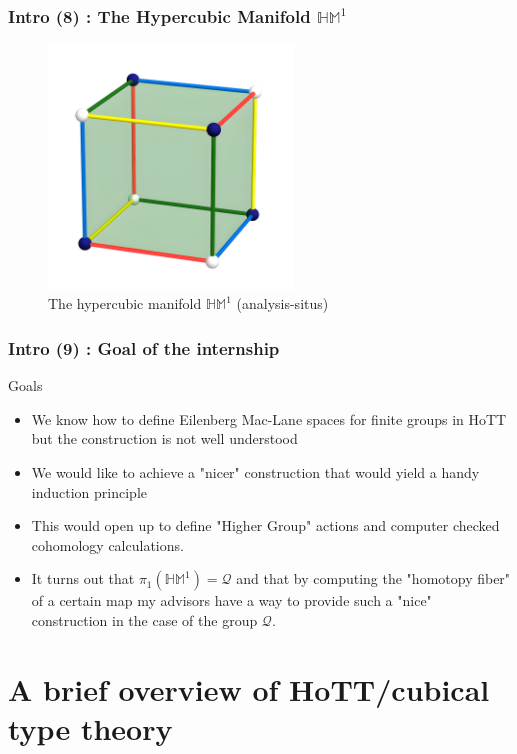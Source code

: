 \documentclass{beamer}
\begin{document}
\begin{frame}
    \frametitle{Intro (8) : The Hypercubic Manifold $\mathbb{HM}^1$}
    \begin{figure}[h]
    \begin{center}
        \includegraphics[height= 6.5cm]{cube-3-2.png}
        \caption{The hypercubic manifold $\mathbb{HM}^1$ (analysis-situs)}
        \label{fig:H1M}
    \end{center}
    \end{figure}
\end{frame}
\begin{frame}
    \frametitle{Intro (9) : Goal of the internship}
    \begin{exampleblock}{Goals}
        \begin{itemize}
            \item We know how to define Eilenberg Mac-Lane spaces for finite groups in HoTT but the construction is not well understood
            \pause
            \item We would like to achieve a "nicer" construction that would yield a handy induction principle
            \pause
            \item This would open up to define "Higher Group" actions and computer checked cohomology calculations.
            \pause
            \item It turns out that $\pi_1(\mathbb{HM}^1)=\mathcal{Q}$ and that by computing the "homotopy fiber" of a certain map my advisors have a way to provide such a "nice" construction in the case of the group $\mathcal Q$.
        \end{itemize}
    \end{exampleblock}
\end{frame}
\section{A brief overview of HoTT/cubical type theory}
\end{document}
